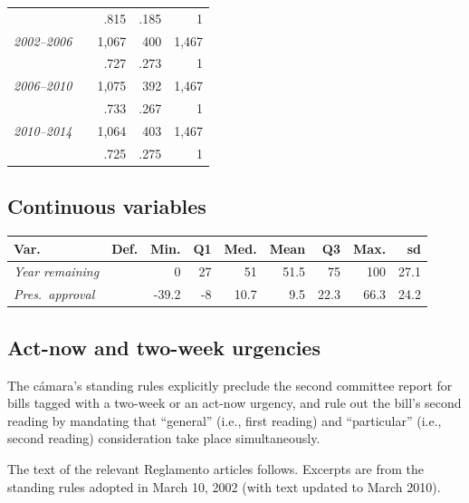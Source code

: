 \documentclass[letter,12pt]{article}
\begin{document}
\begin{footnotesize}
\begin{tabular}{llrrr}
                               &     &   .815 &  .185 &   1   \\
\emph{2002--2006}              &     &  1,067 &   400 & 1,467 \\ [-.75ex]
                               &     &   .727 &  .273 &   1   \\
\emph{2006--2010}              &     &  1,075 &   392 & 1,467 \\ [-.75ex]
                               &     &   .733 &  .267 &   1   \\
\emph{2010--2014}              &     &  1,064 &   403 & 1,467 \\ [-.75ex]
                               &     &   .725 &  .275 &   1   \\
\end{tabular}

\end{footnotesize}
  
\subsection{Continuous variables}

\begin{footnotesize}

  \begin{tabular}{llrrrrrrr}
               Var.  & Def. &  Min.&  Q1 & Med. & Mean &  Q3  &  Max. &   sd \\ \hline
\emph{Year remaining}&      &  0   &  27 & 51   & 51.5 & 75   & 100   &   27.1 \\
\emph{Pres.~approval}&      &-39.2 & -8 &  10.7 &  9.5 & 22.3 &  66.3 &   24.2 \\
\end{tabular}

\end{footnotesize}
  
\subsection{Act-now and two-week urgencies}

The cámara's standing rules explicitly preclude the second committee report for bills tagged with a two-week or an act-now urgency, and rule out the bill's second reading by mandating that ``general'' (i.e., first reading) and ``particular'' (i.e., second reading) consideration take place simultaneously. 

The text of the relevant Reglamento articles follows. Excerpts are from the standing rules adopted in March 10, 2002 (with text updated to March 2010).  
\end{document}

